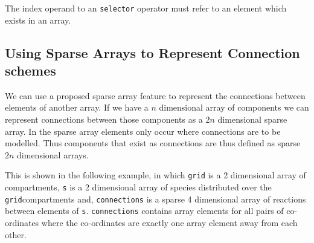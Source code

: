 \documentclass{cekarticle}
\begin{document}
The index operand to an \texttt{selector} operator must refer to an element
which exists in an array.  

\subsection{Using Sparse Arrays to Represent Connection schemes}
\label{sec:connections}

We can use a proposed sparse array feature to represent the connections
between elements of another array.  If we have a $n$ dimensional array of
components we can represent connections between those components as a $2 n$ dimensional 
sparse array.  In the sparse array elements only occur where connections are to be modelled.
Thus components that exist as connections are thus defined as sparse $2 n$ dimensional arrays.

This is shown in the
following example, in which \texttt{grid} is a 2 dimensional
array of compartments, \texttt{s} is a 2 dimensional array of
species distributed over the \texttt{grid}compartments and, \texttt{connections} is a sparse 4
dimensional array of reactions between elements of \texttt{s}.
\texttt{connections} contains array elements for all
pairs of co-ordinates where the co-ordinates are exactly one array element
away from each other.
\end{document}
